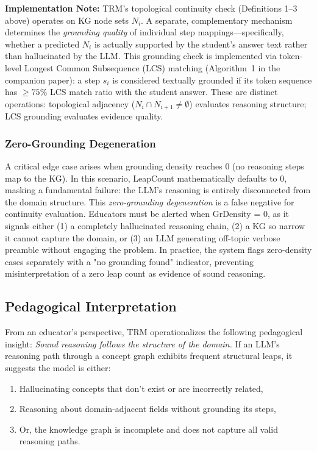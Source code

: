 \documentclass[journal,review]{vgtc}
\begin{document}
\textbf{Implementation Note:} TRM's topological continuity check (Definitions 1--3 above) operates on KG node sets $N_i$. A separate, complementary mechanism determines the \textit{grounding quality} of individual step mappings---specifically, whether a predicted $N_i$ is actually supported by the student's answer text rather than hallucinated by the LLM. This grounding check is implemented via token-level Longest Common Subsequence (LCS) matching (Algorithm~1 in the companion paper): a step $s_i$ is considered textually grounded if its token sequence has $\geq 75\%$ LCS match ratio with the student answer. These are distinct operations: topological adjacency ($N_i \cap N_{i+1} \neq \emptyset$) evaluates reasoning structure; LCS grounding evaluates evidence quality.

\subsubsection{Zero-Grounding Degeneration} \label{sec:zero_grounding}

A critical edge case arises when grounding density reaches 0 (no reasoning steps map to the KG). In this scenario, LeapCount mathematically defaults to 0, masking a fundamental failure: the LLM's reasoning is entirely disconnected from the domain structure. This \textit{zero-grounding degeneration} is a false negative for continuity evaluation. Educators must be alerted when GrDensity = 0, as it signals either (1) a completely hallucinated reasoning chain, (2) a KG so narrow it cannot capture the domain, or (3) an LLM generating off-topic verbose preamble without engaging the problem. In practice, the system flags zero-density cases separately with a "no grounding found" indicator, preventing misinterpretation of a zero leap count as evidence of sound reasoning.

\subsection{Pedagogical Interpretation}

From an educator's perspective, TRM operationalizes the following pedagogical insight: \textit{Sound reasoning follows the structure of the domain.} If an LLM's reasoning path through a concept graph exhibits frequent structural leaps, it suggests the model is either:
\begin{enumerate}
  \item Hallucinating concepts that don't exist or are incorrectly related,
  \item Reasoning about domain-adjacent fields without grounding its steps,
  \item Or, the knowledge graph is incomplete and does not capture all valid reasoning paths.
\end{enumerate}
\end{document}
